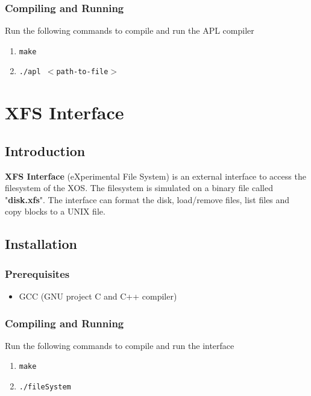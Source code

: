 \documentclass[11pt]{report}
\begin{document}
\subsection{Compiling and Running}
Run the following commands to compile and run the APL compiler
\begin{enumerate}
		\item \texttt{make}
		\item \texttt{./apl $<$path-to-file$>$ }
\end{enumerate}



\chapter{XFS Interface}

\section{Introduction}
\textbf{XFS Interface} (eXperimental File System) is an external interface to access the filesystem of the XOS. The filesystem is simulated on a binary file called "\textbf{disk.xfs}". The interface can format the disk, load/remove files, list files and copy blocks to a UNIX file.

\section{Installation}
\subsection{Prerequisites}
\begin{itemize}
	\item GCC (GNU project C and C++ compiler)
\end{itemize}

%

\subsection{Compiling and Running}
Run the following commands to compile and run the interface
\begin{enumerate}
		\item \texttt{make}
		\item \texttt{./fileSystem}
\end{enumerate}
\end{document}
